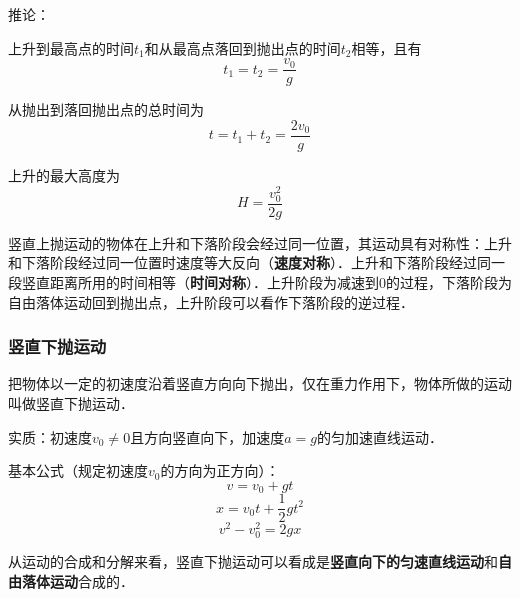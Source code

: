 推论：

上升到最高点的时间$t_1$和从最高点落回到抛出点的时间$t_2$相等，且有
\begin{equation}
t_1=t_2=\frac{v_0}{g}
\end{equation}

从抛出到落回抛出点的总时间为
\begin{equation}
t=t_1+t_2=\frac{2v_0}{g}
\end{equation}

上升的最大高度为
\begin{equation}
H=\frac{v_0^2}{2g}
\end{equation}

竖直上抛运动的物体在上升和下落阶段会经过同一位置，其运动具有对称性：上升和下落阶段经过同一位置时速度等大反向（\textbf{速度对称}）．上升和下落阶段经过同一段竖直距离所用的时间相等（\textbf{时间对称}）．上升阶段为减速到0的过程，下落阶段为自由落体运动回到抛出点，上升阶段可以看作下落阶段的逆过程．

\subsubsection{竖直下抛运动}
把物体以一定的初速度沿着竖直方向向下抛出，仅在重力作用下，物体所做的运动叫做竖直下抛运动．

实质：初速度$v_0\neq0$且方向竖直向下，加速度$a=g$的匀加速直线运动．

基本公式（规定初速度$v_0$的方向为正方向）：
\begin{equation}
v=v_0+gt
\end{equation}
\begin{equation}
x=v_0t+\frac12gt^2
\end{equation}
\begin{equation}
v^2-v_0^2=2gx
\end{equation}

从运动的合成和分解来看，竖直下抛运动可以看成是\textbf{竖直向下的匀速直线运动}和\textbf{自由落体运动}合成的．